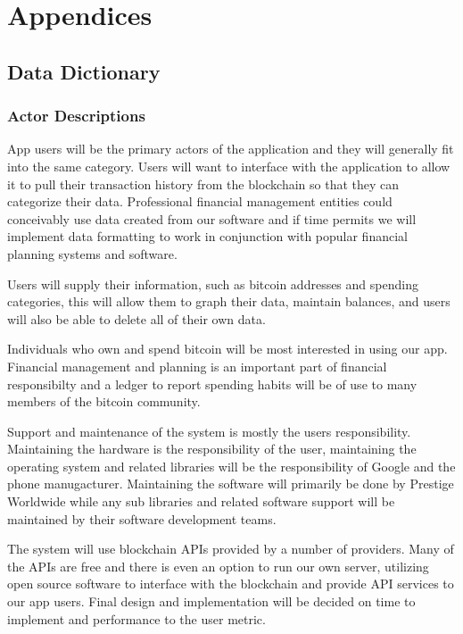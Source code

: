 \renewcommand\thefigure{\thesection.\arabic{figure}}   

\clearpage
\section{Appendices}
  \subsection{Data Dictionary}
    \subsubsection{Actor Descriptions}

App users will be the primary actors of the application and they will generally fit into the same category. Users will want to interface with the application to allow it to pull their transaction history from the blockchain so that they can categorize their data. Professional financial management entities could conceivably use data created from our software and if time permits we will implement data formatting to work in conjunction with popular financial planning systems and software. 

Users will supply their information, such as bitcoin addresses and spending categories, this will allow them to graph their data, maintain balances, and users will also be able to delete all of their own data. 

Individuals who own and spend bitcoin will be most interested in using our app. Financial management and planning is an important part of financial responsibilty and a ledger to report spending habits will be of use to many members of the bitcoin community.

Support and maintenance of the system is mostly the users responsibility. Maintaining the hardware is the responsibility of the user, maintaining the operating system and related libraries will be the responsibility of Google and the phone manugacturer. Maintaining the software will primarily be done by Prestige Worldwide while any sub libraries and related software support will be maintained by their software development teams.

The system will use blockchain APIs provided by a number of providers. Many of the APIs are free and there is even an option to run our own server, utilizing open source software to interface with the blockchain and provide API services to our app users. Final design and implementation will be decided on time to implement and performance to the user metric.

